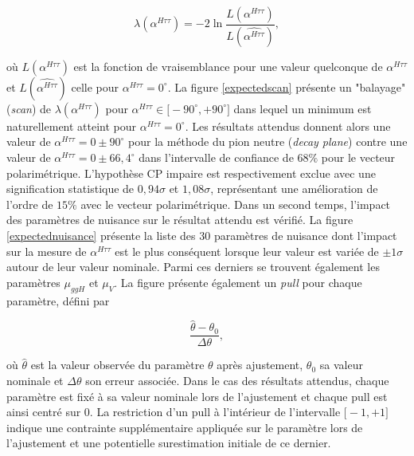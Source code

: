 \begin{equation}
    \lambda(\alpha^{H\tau\tau})=-2\ln\frac{L(\alpha^{H\tau\tau})}{L(\widehat{\alpha^{H\tau\tau}})},
\end{equation}

où $L(\alpha^{H\tau\tau})$ est la fonction de vraisemblance pour une valeur quelconque de $\alpha^{H\tau\tau}$ et $L(\widehat{\alpha^{H\tau\tau}})$ celle pour $\alpha^{H\tau\tau}=0^{\circ}$. La figure \ref{expectedscan} présente un "balayage" (\textit{scan}) de $\lambda(\alpha^{H\tau\tau})$ pour $\alpha^{H\tau\tau}\in\bigl[-90^{\circ},+90^{\circ}\bigr]$ dans lequel un minimum est naturellement atteint pour $\alpha^{H\tau\tau}=0^{\circ}$. Les résultats attendus donnent alors une valeur de $\alpha^{H\tau\tau}=0\pm90^{\circ}$ pour la méthode du pion neutre (\textit{decay plane}) contre une valeur de $\alpha^{H\tau\tau}=0\pm66,4^{\circ}$ dans l'intervalle de confiance de $68\%$ pour le vecteur polarimétrique. L'hypothèse CP impaire est respectivement exclue avec une signification statistique de $0,94\sigma$ et $1,08\sigma$, représentant une amélioration de l'ordre de $15\%$ avec le vecteur polarimétrique. Dans un second temps, l'impact des paramètres de nuisance sur le résultat attendu est vérifié. La figure \ref{expectednuisance} présente la liste des $30$ paramètres de nuisance dont l'impact sur la mesure de $\alpha^{H\tau\tau}$ est le plus conséquent lorsque leur valeur est variée de $\pm1\sigma$ autour de leur valeur nominale. Parmi ces derniers se trouvent également les paramètres $\mu_{ggH}$ et $\mu_V$. La figure présente également un \textit{pull} pour chaque paramètre, défini par 

\begin{equation}
    \frac{\hat{\theta}-\theta_0}{\Delta\theta},
\end{equation}

où $\hat{\theta}$ est la valeur observée du paramètre $\theta$ après ajustement, $\theta_0$ sa valeur nominale et $\Delta\theta$ son erreur associée. Dans le cas des résultats attendus, chaque paramètre est fixé à sa valeur nominale lors de l'ajustement et chaque pull est ainsi centré sur $0$. La restriction d'un pull à l'intérieur de l'intervalle $\bigl[-1,+1\bigr]$ indique une contrainte supplémentaire appliquée sur le paramètre lors de l'ajustement et une potentielle surestimation initiale de ce dernier.

